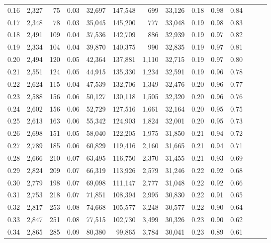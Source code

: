 \begin{tabular}{rrrrrrrrrrrrrr}
0.16 &  2,327 &     75 &  0.03 &   32,697 &  147,548 &     699 &  33,126 &  0.18 &  0.98 &      0.84 \\
0.17 &  2,348 &     78 &  0.03 &   35,045 &  145,200 &     777 &  33,048 &  0.19 &  0.98 &      0.83 \\
0.18 &  2,491 &    109 &  0.04 &   37,536 &  142,709 &     886 &  32,939 &  0.19 &  0.97 &      0.82 \\
0.19 &  2,334 &    104 &  0.04 &   39,870 &  140,375 &     990 &  32,835 &  0.19 &  0.97 &      0.81 \\
0.20 &  2,494 &    120 &  0.05 &   42,364 &  137,881 &   1,110 &  32,715 &  0.19 &  0.97 &      0.80 \\
0.21 &  2,551 &    124 &  0.05 &   44,915 &  135,330 &   1,234 &  32,591 &  0.19 &  0.96 &      0.78 \\
0.22 &  2,624 &    115 &  0.04 &   47,539 &  132,706 &   1,349 &  32,476 &  0.20 &  0.96 &      0.77 \\
0.23 &  2,588 &    156 &  0.06 &   50,127 &  130,118 &   1,505 &  32,320 &  0.20 &  0.96 &      0.76 \\
0.24 &  2,602 &    156 &  0.06 &   52,729 &  127,516 &   1,661 &  32,164 &  0.20 &  0.95 &      0.75 \\
0.25 &  2,613 &    163 &  0.06 &   55,342 &  124,903 &   1,824 &  32,001 &  0.20 &  0.95 &      0.73 \\
0.26 &  2,698 &    151 &  0.05 &   58,040 &  122,205 &   1,975 &  31,850 &  0.21 &  0.94 &      0.72 \\
0.27 &  2,789 &    185 &  0.06 &   60,829 &  119,416 &   2,160 &  31,665 &  0.21 &  0.94 &      0.71 \\
0.28 &  2,666 &    210 &  0.07 &   63,495 &  116,750 &   2,370 &  31,455 &  0.21 &  0.93 &      0.69 \\
0.29 &  2,824 &    209 &  0.07 &   66,319 &  113,926 &   2,579 &  31,246 &  0.22 &  0.92 &      0.68 \\
0.30 &  2,779 &    198 &  0.07 &   69,098 &  111,147 &   2,777 &  31,048 &  0.22 &  0.92 &      0.66 \\
0.31 &  2,753 &    218 &  0.07 &   71,851 &  108,394 &   2,995 &  30,830 &  0.22 &  0.91 &      0.65 \\
0.32 &  2,817 &    253 &  0.08 &   74,668 &  105,577 &   3,248 &  30,577 &  0.22 &  0.90 &      0.64 \\
0.33 &  2,847 &    251 &  0.08 &   77,515 &  102,730 &   3,499 &  30,326 &  0.23 &  0.90 &      0.62 \\
0.34 &  2,865 &    285 &  0.09 &   80,380 &   99,865 &   3,784 &  30,041 &  0.23 &  0.89 &      0.61 \\

\end{tabular}
